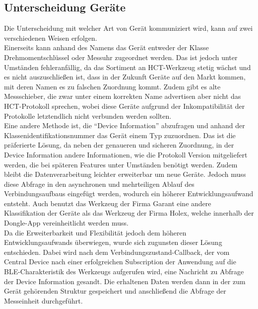 \subsection{Unterscheidung Geräte}
Die Unterscheidung mit welcher Art von Gerät kommuniziert wird, kann auf zwei verschiedenen Weisen erfolgen. \\
Einerseits kann anhand des Namens das Gerät entweder der Klasse Drehmomentschlüssel oder Messuhr zugeordnet werden. Das ist jedoch unter Umständen fehleranfällig, da das Sortiment an HCT-Werkzeug stetig wächst und es nicht auszuschließen ist, dass in der Zukunft Geräte auf den Markt kommen, mit deren Namen es zu falschen Zuordnung kommt. Zudem gibt es alte Messschieber, die zwar unter einem korrekten Name advertisen aber nicht das HCT-Protokoll sprechen, wobei diese Geräte aufgrund der Inkompatibilität der Protokolle letztendlich nicht verbunden werden sollten. \\
Eine andere Methode ist, die ``Device Information'' abzufragen und anhand der Klassenidentifikationsnummer das Gerät einem Typ zuzuordnen. Das ist die präferierte Lösung, da neben der genaueren und sicheren Zuordnung, in der Device Information andere Informationen, wie die Protokoll Version mitgeliefert werden, die bei späteren Features unter Umständen benötigt werden. Zudem bleibt die Datenverarbeitung leichter erweiterbar um neue Geräte. Jedoch muss diese Abfrage in den asynchronen und mehrteiligen Ablauf des Verbindungsaufbaus eingefügt werden, wodurch ein höherer Entwicklungsaufwand entsteht. Auch benutzt das Werkzeug der Firma Garant eine andere Klassifikation der Geräte als das Werkzeug der Firma Holex, welche innerhalb der Dongle-App vereinheitlicht werden muss.\\
Da die Erweiterbarkeit und Flexibilität jedoch dem höheren Entwicklungsaufwands überwiegen, wurde sich zugunsten dieser Lösung entschieden. Dabei wird nach dem Verbindungszustand-Callback, der vom Central Device nach einer erfolgreichen Subscription der Anwendung auf die BLE-Charakteristik des Werkzeugs aufgerufen wird, eine Nachricht zu Abfrage der Device Information gesandt. Die erhaltenen Daten werden dann in der zum Gerät gehörenden Struktur gespeichert und anschließend die Abfrage der Messeinheit durchgeführt.

